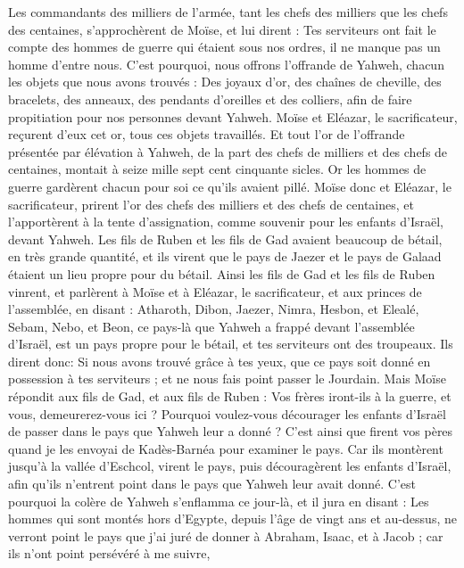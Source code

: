 \begin{multicols}{2}
Les commandants des milliers de l'armée, tant les chefs des milliers que les chefs des centaines, s'approchèrent de Moïse,
et lui dirent : Tes serviteurs ont fait le compte des hommes de guerre qui étaient sous nos ordres, il ne manque pas un homme d'entre nous.
C'est pourquoi, nous offrons l'offrande de Yahweh, chacun les objets que nous avons trouvés : Des joyaux d'or, des chaînes de cheville, des bracelets, des anneaux, des pendants d'oreilles et des colliers, afin de faire propitiation pour nos personnes devant Yahweh.
Moïse et Eléazar, le sacrificateur, reçurent d'eux cet or, tous ces objets travaillés.
Et tout l'or de l'offrande présentée par élévation à Yahweh, de la part des chefs de milliers et des chefs de centaines, montait à seize mille sept cent cinquante sicles.
Or les hommes de guerre gardèrent chacun pour soi ce qu'ils avaient pillé.
Moïse donc et Eléazar, le sacrificateur, prirent l'or des chefs des milliers et des chefs de centaines, et l'apportèrent à la tente d'assignation, comme souvenir pour les enfants d'Israël, devant Yahweh.
\VerseOne{}Les fils de Ruben et les fils de Gad avaient beaucoup de bétail, en très grande quantité, et ils virent que le pays de Jaezer et le pays de Galaad étaient un lieu propre pour du bétail.
Ainsi les fils de Gad et les fils de Ruben vinrent, et parlèrent à Moïse et à Eléazar, le sacrificateur, et aux princes de l'assemblée, en disant :
Atharoth, Dibon, Jaezer, Nimra, Hesbon, et Elealé, Sebam, Nebo, et Beon,
ce pays-là que Yahweh a frappé devant l'assemblée d'Israël, est un pays propre pour le bétail, et tes serviteurs ont des troupeaux.
Ils dirent donc: Si nous avons trouvé grâce à tes yeux, que ce pays soit donné en possession à tes serviteurs ; et ne nous fais point passer le Jourdain.
Mais Moïse répondit aux fils de Gad, et aux fils de Ruben : Vos frères iront-ils à la guerre, et vous, demeurerez-vous ici ?
Pourquoi voulez-vous décourager les enfants d'Israël de passer dans le pays que Yahweh leur a donné ?
C'est ainsi que firent vos pères quand je les envoyai de Kadès-Barnéa pour examiner le pays.
Car ils montèrent jusqu'à la vallée d'Eschcol, virent le pays, puis découragèrent les enfants d'Israël, afin qu'ils n'entrent point dans le pays que Yahweh leur avait donné.
C'est pourquoi la colère de Yahweh s'enflamma ce jour-là, et il jura en disant :
Les hommes qui sont montés hors d'Egypte, depuis l'âge de vingt ans et au-dessus, ne verront point le pays que j'ai juré de donner à Abraham, Isaac, et à Jacob ; car ils n’ont point persévéré à me suivre,

\end{multicols}

